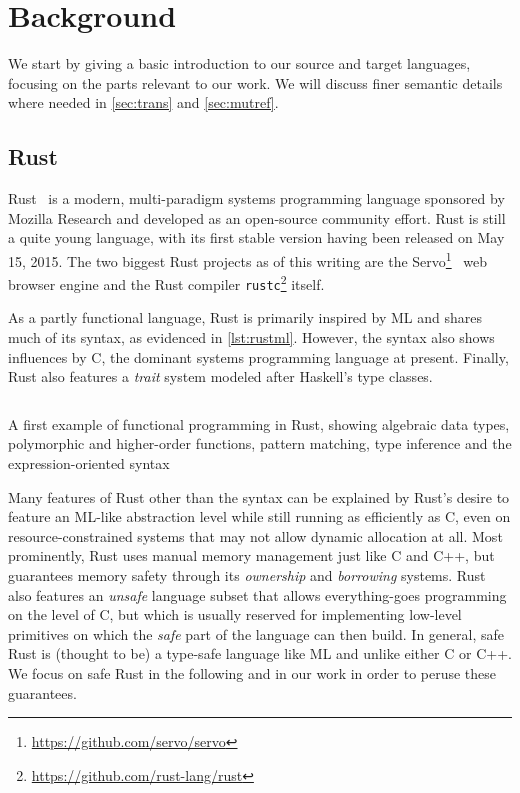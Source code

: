 \section{Background}

We start by giving a basic introduction to our source and target
languages, focusing on the parts relevant to our work. We will discuss finer
semantic details where needed in \autoref{sec:trans} and \autoref{sec:mutref}.

\subsection{Rust}
\label{sec:rust}

Rust~\cite{matsakis2014rust} is a modern, multi-paradigm systems programming language sponsored
by Mozilla Research and developed as an open-source community effort. Rust is still a quite young language, with its first stable
version having been released on May 15, 2015. The two biggest Rust projects as of
this writing are the Servo\footnote{\url{https://github.com/servo/servo}}~\cite{anderson2016engineering} web browser engine and
the Rust compiler \texttt{rustc}\footnote{\url{https://github.com/rust-lang/rust}} itself.

As a partly functional language, Rust is primarily inspired by ML and shares much of
its syntax, as evidenced in \autoref{lst:rustml}. However, the syntax also shows
influences by C, the dominant systems programming language at present.
Finally, Rust also features a \emph{trait} system modeled after Haskell's type classes.

\begin{listing}[!bp]
  \inputminted{rust}{code/rustml.rs}
  
  \caption{A first example of functional programming in Rust, showing algebraic
    data types, polymorphic and higher-order functions, pattern matching, type
    inference and the expression-oriented syntax}
  \label{lst:rustml}
\end{listing}

Many features of Rust other than the syntax can be explained by Rust's desire to
feature an ML-like abstraction level while still running as efficiently as C,
even on resource-constrained systems that may not allow dynamic allocation at all.
Most prominently, Rust uses manual memory management just like C and C++, but
guarantees memory safety through its \emph{ownership} and
\emph{borrowing} systems. Rust also features an \emph{unsafe} language subset that allows
everything-goes programming on the level of C, but which is usually reserved for
implementing low-level primitives on which the \emph{safe} part of the language can
then build. In general, safe Rust is (thought to be) a type-safe
language like ML and unlike either C or C++. We focus on safe Rust in the
following and in our work in order to peruse these guarantees.

